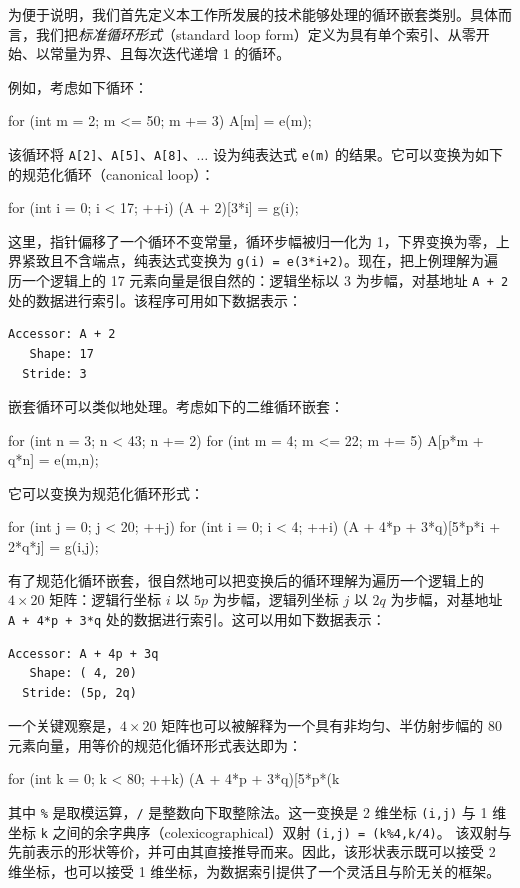 为便于说明，我们首先定义本工作所发展的技术能够处理的循环嵌套类别。具体而言，我们把{\em 标准循环形式}（standard loop form）定义为具有单个索引、从零开始、以常量为界、且每次迭代递增 1 的循环。

例如，考虑如下循环：
\begin{cpp}
for (int m = 2; m <= 50; m += 3)
  A[m] = e(m);
\end{cpp}
该循环将 {\tt A[2]}、{\tt A[5]}、{\tt A[8]}、$\ldots$ 设为纯表达式 {\tt e(m)} 的结果。它可以变换为如下的规范化循环（canonical loop）：
\begin{cpp}
for (int i = 0; i < 17; ++i)
  (A + 2)[3*i] = g(i);
\end{cpp}
这里，指针偏移了一个循环不变常量，循环步幅被归一化为 1，下界变换为零，上界紧致且不含端点，纯表达式变换为 {\tt g(i) = e(3*i+2)}。现在，把上例理解为遍历一个逻辑上的 17 元素向量是很自然的：逻辑坐标以 3 为步幅，对基地址 {\tt A + 2} 处的数据进行索引。该程序可用如下数据表示：
\begin{verbatim}
Accessor: A + 2
   Shape: 17
  Stride: 3
\end{verbatim}
嵌套循环可以类似地处理。考虑如下的二维循环嵌套：
\begin{cpp}
for (int n = 3; n < 43; n += 2)
  for (int m = 4; m <= 22; m += 5)
    A[p*m + q*n] = e(m,n);
\end{cpp}
它可以变换为规范化循环形式：
\begin{cpp}
for (int j = 0; j < 20; ++j)
  for (int i = 0; i < 4; ++i)
    (A + 4*p + 3*q)[5*p*i + 2*q*j] = g(i,j);
\end{cpp}
有了规范化循环嵌套，很自然地可以把变换后的循环理解为遍历一个逻辑上的 $4 {\times} 20$ 矩阵：逻辑行坐标 $i$ 以 $5p$ 为步幅，逻辑列坐标 $j$ 以 $2q$ 为步幅，对基地址 {\tt A + 4*p + 3*q} 处的数据进行索引。这可以用如下数据表示：
\begin{verbatim}
Accessor: A + 4p + 3q
   Shape: ( 4, 20)
  Stride: (5p, 2q)
\end{verbatim}
一个关键观察是，$4 {\times} 20$ 矩阵也可以被解释为一个具有非均匀、半仿射步幅的 80 元素向量，用等价的规范化循环形式表达即为：
\begin{cpp}
for (int k = 0; k < 80; ++k)
  (A + 4*p + 3*q)[5*p*(k%
\end{cpp}
其中 {\tt \%} 是取模运算，{\tt /} 是整数向下取整除法。这一变换是 2 维坐标 \verb|(i,j)| 与 1 维坐标 \verb|k| 之间的余字典序（colexicographical）双射 \verb|(i,j) = (k%4,k/4)|。
该双射与先前表示的形状等价，并可由其直接推导而来。因此，该形状表示既可以接受 2 维坐标，也可以接受 1 维坐标，为数据索引提供了一个灵活且与阶无关的框架。

